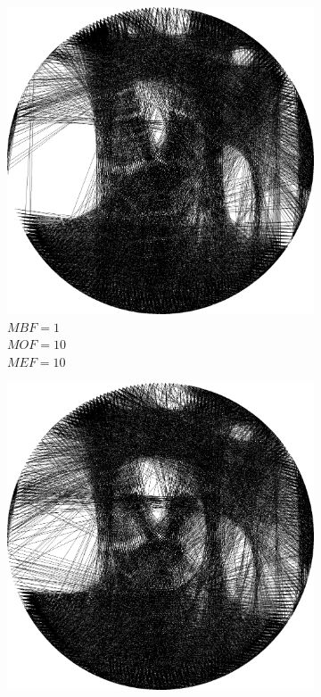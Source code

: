 \documentclass[a4paper, 12pt, polish, twoside]{extreport}
\begin{document}
\begin{figure}[H]
\begin{subfigure}{0.32\textwidth}
        \includegraphics[width = \textwidth]{img/4-mine/taco-thread/taco_e_i3000_c20_inv0_bg1_obj10_ed10.png}
        \caption{\(MBF = 1\) \\ \(MOF = 10\) \\ \(MEF = 10\)}
        \label{mine-param-taco-thread-g}
    \end{subfigure}
    \begin{subfigure}{0.32\textwidth}
        \centering
        \includegraphics[width = \textwidth]{img/4-mine/taco-thread/taco_e_i3000_c20_inv0_bg10_obj1_ed10.png}

\end{subfigure}
\end{figure}
\end{document}
